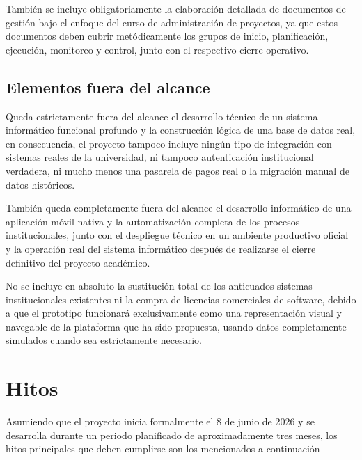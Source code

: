 \documentclass[11pt,spanish]{article}
\begin{document}
También se incluye obligatoriamente la elaboración detallada de documentos de gestión bajo el enfoque del curso de administración de proyectos, ya que estos documentos deben cubrir metódicamente los grupos de inicio, planificación, ejecución, monitoreo y control, junto con el respectivo cierre operativo.

\subsection{Elementos fuera del alcance}

Queda estrictamente fuera del alcance el desarrollo técnico de un sistema informático funcional profundo y la construcción lógica de una base de datos real, en consecuencia, el proyecto tampoco incluye ningún tipo de integración con sistemas reales de la universidad, ni tampoco autenticación institucional verdadera, ni mucho menos una pasarela de pagos real o la migración manual de datos históricos.

También queda completamente fuera del alcance el desarrollo informático de una aplicación móvil nativa y la automatización completa de los procesos institucionales, junto con el despliegue técnico en un ambiente productivo oficial y la operación real del sistema informático después de realizarse el cierre definitivo del proyecto académico.

No se incluye en absoluto la sustitución total de los anticuados sistemas institucionales existentes ni la compra de licencias comerciales de software, debido a que el prototipo funcionará exclusivamente como una representación visual y navegable de la plataforma que ha sido propuesta, usando datos completamente simulados cuando sea estrictamente necesario.

\section{Hitos}

Asumiendo que el proyecto inicia formalmente el 8 de junio de 2026 y se desarrolla durante un periodo planificado de aproximadamente tres meses, los hitos principales que deben cumplirse son los mencionados a continuación
\end{document}
